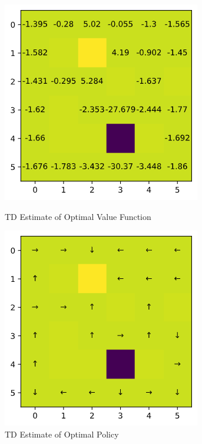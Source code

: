 \documentclass[12pt]{article}
\begin{document}
\begin{figure}[H]
  \centering
  \begin{minipage}[b]{0.3\textwidth}
    \includegraphics[width=\textwidth]{figures/2d2_value.png}
    \caption{TD Estimate of Optimal Value Function}
    \label{figure:2d2_value}
  \end{minipage}
  \hspace{3em}
  \begin{minipage}[b]{0.3\textwidth}
    \includegraphics[width=\textwidth]{figures/2d2_policy.png}
    \caption{TD Estimate of Optimal Policy}
    \label{figure:2d2_policy}
  \end{minipage}
\end{figure}
\end{document}
